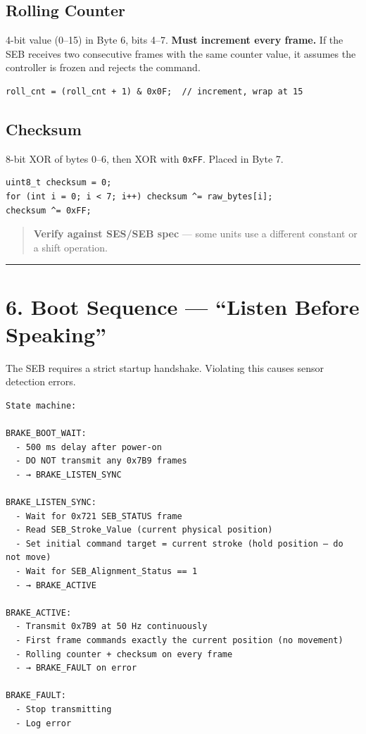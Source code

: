 \documentclass[12pt,a4paper,oneside]{report}
\begin{document}
\subsection{Rolling Counter}\label{rolling-counter}

4-bit value (0--15) in Byte 6, bits 4--7. \textbf{Must increment every frame.}
If the SEB receives two consecutive frames with the same counter value, it
assumes the controller is frozen and rejects the command.

\begin{verbatim}
roll_cnt = (roll_cnt + 1) & 0x0F;  // increment, wrap at 15
\end{verbatim}

\subsection{Checksum}\label{checksum}

8-bit XOR of bytes 0--6, then XOR with \texttt{0xFF}. Placed in Byte 7.

\begin{verbatim}
uint8_t checksum = 0;
for (int i = 0; i < 7; i++) checksum ^= raw_bytes[i];
checksum ^= 0xFF;
\end{verbatim}

\begin{quote}
\textbf{Verify against SES/SEB spec} --- some units use a different constant or
a shift operation.
\end{quote}

\begin{center}\rule{0.5\linewidth}{0.5pt}\end{center}

\section{6. Boot Sequence --- ``Listen Before
Speaking''}\label{boot-sequence-listen-before-speaking}

The SEB requires a strict startup handshake. Violating this causes sensor
detection errors.

\begin{verbatim}
State machine:

BRAKE_BOOT_WAIT:
  - 500 ms delay after power-on
  - DO NOT transmit any 0x7B9 frames
  - → BRAKE_LISTEN_SYNC

BRAKE_LISTEN_SYNC:
  - Wait for 0x721 SEB_STATUS frame
  - Read SEB_Stroke_Value (current physical position)
  - Set initial command target = current stroke (hold position — do not move)
  - Wait for SEB_Alignment_Status == 1
  - → BRAKE_ACTIVE

BRAKE_ACTIVE:
  - Transmit 0x7B9 at 50 Hz continuously
  - First frame commands exactly the current position (no movement)
  - Rolling counter + checksum on every frame
  - → BRAKE_FAULT on error

BRAKE_FAULT:
  - Stop transmitting
  - Log error
\end{verbatim}
\end{document}
